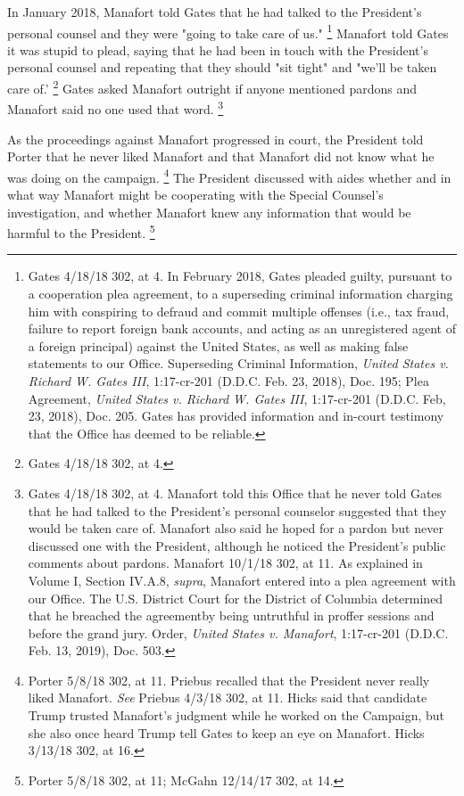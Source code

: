{In January 2018, Manafort told Gates that he had talked to the President's personal counsel and they were "going to take care of us."%
\footnote{Gates 4/18/18 302, at 4.
In February 2018, Gates pleaded guilty, pursuant to a cooperation plea agreement, to a superseding criminal information charging him with conspiring to defraud and commit multiple offenses (i.e., tax fraud, failure to report foreign bank accounts, and acting as an unregistered agent of a foreign principal) against the United States, as well as making false statements to our Office.
Superseding Criminal Information, \textit{United States v. Richard W. Gates III}, 1:17-cr-201 (D.D.C. Feb. 23, 2018), Doc. 195;
Plea Agreement, \textit{United States v. Richard W. Gates III}, 1:17-cr-201 (D.D.C. Feb, 23, 2018), Doc. 205.
Gates has provided information and in-court testimony that the Office has deemed to be reliable.}
Manafort told Gates it was stupid to plead, saying that he had been in touch with the President's personal counsel and repeating that they should "sit tight" and "we'll be taken care of.'%
\footnote{Gates 4/18/18 302, at 4.}
Gates asked Manafort outright if anyone mentioned pardons and Manafort said no one used that word.%
\footnote{Gates 4/18/18 302, at 4.
Manafort told this Office that he never told Gates that he had talked to the President’s personal counselor suggested that they would be taken care of.
Manafort also said he hoped for a pardon but never discussed one with the President, although he noticed the President’s public comments about pardons.
Manafort 10/1/18 302, at 11.
As explained in Volume I, Section IV.A.8, \textit{supra}, Manafort entered into a plea agreement with our Office.
The U.S. District Court for the District of Columbia determined that he breached the agreementby being untruthful in proffer sessions and before the grand jury.
Order, \textit{United States v. Manafort}, 1:17-cr-201 (D.D.C. Feb. 13, 2019), Doc. 503.}

As the proceedings against Manafort progressed in court, the President told Porter that he never liked Manafort and that Manafort did not know what he was doing on the campaign.%
\footnote{Porter 5/8/18 302, at 11.
Priebus recalled that the President never really liked Manafort.
\textit{See} Priebus 4/3/18 302, at 11.
Hicks said that candidate Trump trusted Manafort’s judgment while he worked on the Campaign, but she also once heard Trump tell Gates to keep an eye on Manafort.
Hicks 3/13/18 302, at 16.}
The President discussed with aides whether and in what way Manafort might be cooperating with the Special Counsel's investigation, and whether Manafort knew any information that would be harmful to the President.%
\footnote{Porter 5/8/18 302, at 11;
McGahn 12/14/17 302, at 14.}

}
